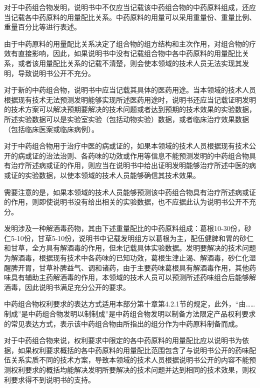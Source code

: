 对于中药组合物发明，说明书中不仅应当记载该中药组合物的中药原料组成，还应当记载各中药原料的用量配比关系。中药原料的用量可以采用重量份、重量比例、重量百分比等进行表述。

由于中药原料的用量配比关系决定了组合物的组方结构和主次作用，对组合物的疗效有直接影响，因此，如果说明书中没有记载组合物中各中药原料的用量配比关系，或者该用量配比关系的记载不清楚，则会使本领域的技术人员无法实现其发明，导致说明书公开不充分。

对于新的中药组合物，说明书中应当记载其具体的医药用途。当本领域的技术人员根据现有技术无法预测发明能够实现所述医药用途时，说明书还应当记载证明发明的技术方案可以解决预期要解决的技术问题或者达到预期的技术效果的实验数据，所述实验数据可以是实验室实验（包括动物实验）数据，或者临床治疗效果数据（包括临床医案或临床病例）。

对于中药组合物用于治疗中医的病或证的，如果本领域的技术人员根据现有技术公开的病或证的治法治则、各药味的功效或作用等信息不能预测发明的中药组合物具有治疗所述病或证的作用，则应当在说明书中给出证明发明能够治疗所述中医的病或证的实验数据，以使本领域的技术人员能够确信其技术效果。

需要注意的是，如果本领域的技术人员能够预测该中药组合物具有治疗所述病或证的作用，则即使说明书没有给出相关的实验数据，也不应据此认为说明书公开不充分。

{\par}

发明涉及一种解酒毒药物，其由下述重量配比的中药原料组成：葛根10-30份，砂仁5-10份，甘草5-10份，说明书中记载发明组方以葛根为主，配伍健脾和胃的砂仁和甘草，全方具有解酒毒的作用，但未记载具体实验数据。发明要解决的技术问题为解酒毒，根据现有技术中各药味的已知功效，葛根生津止渴、解酒毒，砂仁化湿醒脾开胃，甘草补脾益气、调和诸药，由于主要药味葛根具有解酒毒作用，其他药味具有辅助主药解酒毒的作用，本领域的技术人员可以预测所述药味组合后能够解酒毒，因此说明书满足充分公开的要求。

中药组合物权利要求的表达方式适用本部分第十章第4.2.1节的规定，此外，“由……制成”是中药组合物发明以制制成”是中药组合物发明以制备方法限定产品权利要求的常见表达方式，表示该中药组合物由所指出的组分作为中药原料制备而成。

对于中药组合物来说，权利要求中限定的各中药原料的用量配比应以说明书为依据，如果权利要求概括的各中药原料的用量配比范围包含了与说明书公开的药味配伍关系实质不同的技术方案，导致本领域的技术人员根据说明书公开的内容不能预测权利要求的概括均能解决发明所要解决的技术问题并达到相同的技术效果，则权利要求得不到说明书的支持。

